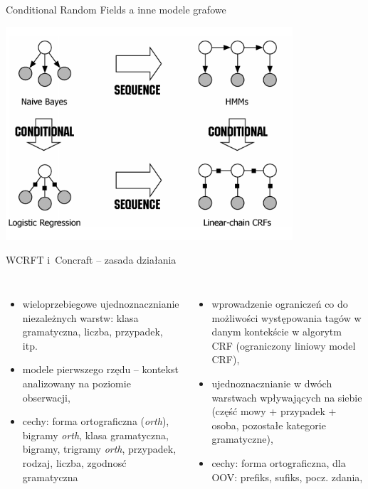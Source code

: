 \documentclass[xcolor=dvipsnames,polish]{beamer}
\begin{document}
\begin{frame}{Conditional Random Fields a inne modele grafowe}
  \begin{center}
    \includegraphics[width=0.8\textwidth]{img/pgms.png}
  \end{center}
\end{frame}

\begin{frame}{WCRFT i~Concraft -- zasada działania}
\begin{columns}[t]
  \begin{itemize}
    \item wieloprzebiegowe ujednoznacznianie niezależnych warstw: klasa gramatyczna, liczba, przypadek, itp.
    \item modele pierwszego rzędu -- kontekst analizowany na poziomie obserwacji,
    \item cechy: forma ortograficzna (\emph{orth}), bigramy \emph{orth}, klasa gramatyczna, bigramy, trigramy \emph{orth}, przypadek, rodzaj, liczba, zgodnosć gramatyczna
  \end{itemize}
  \begin{itemize}
    \item wprowadzenie ograniczeń co do możliwości występowania tagów w danym kontekście w algorytm CRF (ograniczony liniowy model CRF),
    \item ujednoznacznianie w dwóch warstwach wpływających na siebie (część mowy + przypadek + osoba, pozostałe kategorie gramatyczne),
    \item cechy: forma ortograficzna, dla OOV: prefiks, sufiks, pocz. zdania,
  \end{itemize}
\end{columns}
\end{frame}
\end{document}
